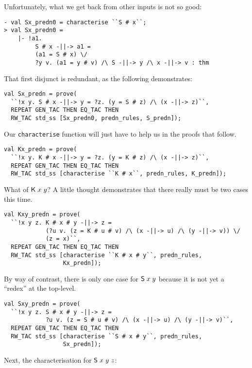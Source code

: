 \documentclass[12pt]{article}
\newcommand{\KC}{\con{K}}
\newcommand{\SC}{\con{S}}
\begin{document}
Unfortunately, what we get back from other inputs is not so good:
\begin{session}\begin{verbatim}
- val Sx_predn0 = characterise ``S # x``;
> val Sx_predn0 =
    |- !a1.
         S # x -||-> a1 =
         (a1 = S # x) \/
         ?y v. (a1 = y # v) /\ S -||-> y /\ x -||-> v : thm
\end{verbatim}\end{session}
That first disjunct is redundant, as the following demonstrates:
\begin{session}\begin{verbatim}
val Sx_predn = prove(
  ``!x y. S # x -||-> y = ?z. (y = S # z) /\ (x -||-> z)``,
  REPEAT GEN_TAC THEN EQ_TAC THEN
  RW_TAC std_ss [Sx_predn0, predn_rules, S_predn]);
\end{verbatim}\end{session}
Our \texttt{characterise} function will just have to help us in the
proofs that follow.
\begin{session}\begin{verbatim}
val Kx_predn = prove(
  ``!x y. K # x -||-> y = ?z. (y = K # z) /\ (x -||-> z)``,
  REPEAT GEN_TAC THEN EQ_TAC THEN
  RW_TAC std_ss [characterise ``K # x``, predn_rules, K_predn]);
\end{verbatim}\end{session}
What of $\KC\;x\;y$?  A little thought demonstrates that there really
must be two cases this time.
\begin{session}\begin{verbatim}
val Kxy_predn = prove(
  ``!x y z. K # x # y -||-> z =
            (?u v. (z = K # u # v) /\ (x -||-> u) /\ (y -||-> v)) \/
            (z = x)``,
  REPEAT GEN_TAC THEN EQ_TAC THEN
  RW_TAC std_ss [characterise ``K # x # y``, predn_rules,
                 Kx_predn]);
\end{verbatim}\end{session}
By way of contrast, there is only one case for $\SC\;x\;y$ because it
is not yet a ``redex'' at the top-level.
\begin{session}\begin{verbatim}
val Sxy_predn = prove(
  ``!x y z. S # x # y -||-> z =
            ?u v. (z = S # u # v) /\ (x -||-> u) /\ (y -||-> v)``,
  REPEAT GEN_TAC THEN EQ_TAC THEN
  RW_TAC std_ss [characterise ``S # x # y``, predn_rules,
                 Sx_predn]);
\end{verbatim}\end{session}
Next, the characterisation for $\SC\;x\;y\;z$:
\end{document}
